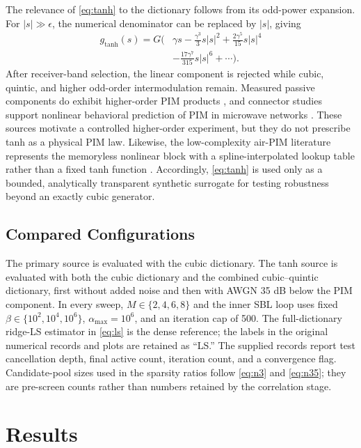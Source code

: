 \documentclass[conference]{IEEEtran}
\begin{document}
The relevance of \eqref{eq:tanh} to the dictionary follows from its odd-power expansion. For $|s|\gg\epsilon$, the numerical denominator can be replaced by $|s|$, giving
\begin{equation}
\begin{split}
 g_{\tanh}(s)=G\bigg(&\gamma s-\frac{\gamma^3}{3}s|s|^2
 +\frac{2\gamma^5}{15}s|s|^4\\
 &-\frac{17\gamma^7}{315}s|s|^6+\cdots\bigg).
\end{split}
\label{eq:tanh-series}
\end{equation}
After receiver-band selection, the linear component is rejected while cubic, quintic, and higher odd-order intermodulation remain. Measured passive components do exhibit higher-order PIM products \cite{Christianson2008HigherOrder}, and connector studies support nonlinear behavioral prediction of PIM in microwave networks \cite{Henrie2008Prediction}. These sources motivate a controlled higher-order experiment, but they do not prescribe tanh as a physical PIM law. Likewise, the low-complexity air-PIM literature represents the memoryless nonlinear block with a spline-interpolated lookup table rather than a fixed tanh function \cite{Lampu2023Cascade}. Accordingly, \eqref{eq:tanh} is used only as a bounded, analytically transparent synthetic surrogate for testing robustness beyond an exactly cubic generator.

\subsection{Compared Configurations}
The primary source is evaluated with the cubic dictionary. The tanh source is evaluated with both the cubic dictionary and the combined cubic--quintic dictionary, first without added noise and then with AWGN 35 dB below the PIM component. In every sweep, $M\in\{2,4,6,8\}$ and the inner SBL loop uses fixed $\beta\in\{10^2,10^4,10^6\}$, $\alpha_{\max}=10^6$, and an iteration cap of 500. The full-dictionary ridge-LS estimator in \eqref{eq:ls} is the dense reference; the labels in the original numerical records and plots are retained as ``LS.'' The supplied records report test cancellation depth, final active count, iteration count, and a convergence flag. Candidate-pool sizes used in the sparsity ratios follow \eqref{eq:n3} and \eqref{eq:n35}; they are pre-screen counts rather than numbers retained by the correlation stage.



\section{Results}
\label{sec:results}
\end{document}
